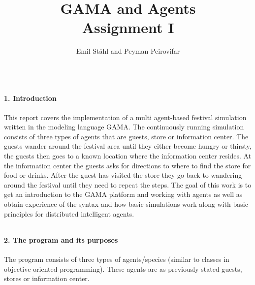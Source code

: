 \documentclass[a4paper,10pt]{article}
\title{\textbf{GAMA and Agents} \\ 
\textbf{Assignment I}}
\author{Emil Ståhl and Peyman Peirovifar}
\begin{document}
\maketitle
\textbf
{\\1. Introduction\\\\}
This report covers the implementation of a multi agent-based festival simulation written in the modeling language GAMA. The continuously running simulation consists of three types of agents that are guests, store or information center. The guests wander around the festival area until they either become hungry or thirsty, the guests then goes to a known location where the information center resides. At the information center the guests asks for directions to where to find the store for food or drinks. After the guest has visited the store they go back to wandering around the festival until they need to repeat the steps. The goal of this work is to get an introduction to the GAMA platform and working with agents as well as obtain experience of the syntax and how basic simulations work along with basic principles for distributed intelligent agents.


\maketitle
\textbf
{\\2. The program and its purposes\\\\}
The program consists of three types of agents/species (similar to classes in objective oriented programming). These agents are as previously stated guests, stores or information center. 
\end{document}
